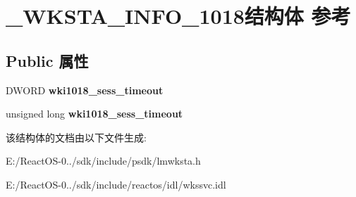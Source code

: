 \hypertarget{struct___w_k_s_t_a___i_n_f_o__1018}{}\section{\+\_\+\+W\+K\+S\+T\+A\+\_\+\+I\+N\+F\+O\+\_\+1018结构体 参考}
\label{struct___w_k_s_t_a___i_n_f_o__1018}
\subsection*{Public 属性}
\begin{DoxyCompactItemize}
\item 
\mbox{\label{struct___w_k_s_t_a___i_n_f_o__1018_aaff05e560e6a3c567297fcce5260c9a2}} 
D\+W\+O\+RD {\bfseries wki1018\+\_\+sess\+\_\+timeout}
\item 
\mbox{\label{struct___w_k_s_t_a___i_n_f_o__1018_a296a0bd46cbb5e7b5d20c2c31149d39e}} 
unsigned long {\bfseries wki1018\+\_\+sess\+\_\+timeout}
\end{DoxyCompactItemize}


该结构体的文档由以下文件生成\+:\begin{DoxyCompactItemize}
\item 
E\+:/\+React\+O\+S-\/0../sdk/include/psdk/lmwksta.\+h\item 
E\+:/\+React\+O\+S-\/0../sdk/include/reactos/idl/wkssvc.\+idl\end{DoxyCompactItemize}

